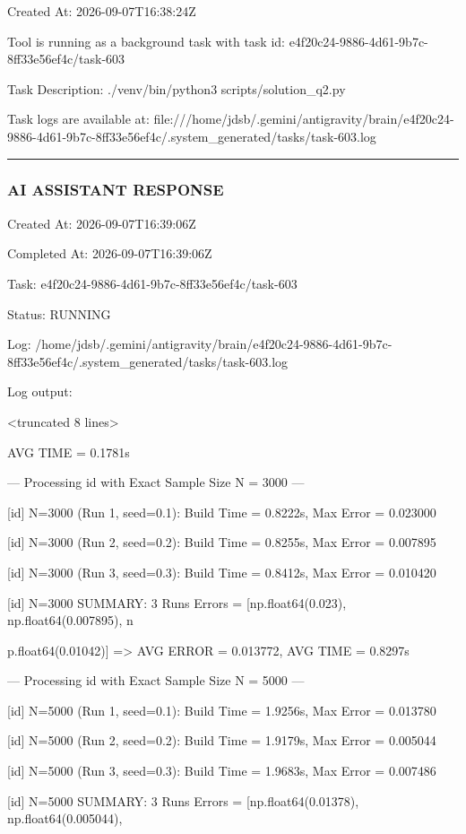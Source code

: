\documentclass[11pt,a4paper]{article}
\begin{document}
Created At: 2026-09-07T16:38:24Z

Tool is running as a background task with task id: e4f20c24-9886-4d61-9b7c-8ff33e56ef4c/task-603

Task Description: ./venv/bin/python3 scripts/solution\_q2.py

Task logs are available at: file:///home/jdsb/.gemini/antigravity/brain/e4f20c24-9886-4d61-9b7c-8ff33e56ef4c/.system\_generated/tasks/task-603.log


\hrule

\subsubsection{AI ASSISTANT RESPONSE}

Created At: 2026-09-07T16:39:06Z

Completed At: 2026-09-07T16:39:06Z

Task: e4f20c24-9886-4d61-9b7c-8ff33e56ef4c/task-603

Status: RUNNING

Log: /home/jdsb/.gemini/antigravity/brain/e4f20c24-9886-4d61-9b7c-8ff33e56ef4c/.system\_generated/tasks/task-603.log

Log output:

<truncated 8 lines>

AVG TIME = 0.1781s

--- Processing id with Exact Sample Size N = 3000 ---

[id] N=3000 (Run 1, seed=0.1): Build Time = 0.8222s, Max Error = 0.023000

[id] N=3000 (Run 2, seed=0.2): Build Time = 0.8255s, Max Error = 0.007895

[id] N=3000 (Run 3, seed=0.3): Build Time = 0.8412s, Max Error = 0.010420

[id] N=3000 SUMMARY: 3 Runs Errors = [np.float64(0.023), np.float64(0.007895), n

p.float64(0.01042)] => AVG ERROR = 0.013772, AVG TIME = 0.8297s

--- Processing id with Exact Sample Size N = 5000 ---

[id] N=5000 (Run 1, seed=0.1): Build Time = 1.9256s, Max Error = 0.013780

[id] N=5000 (Run 2, seed=0.2): Build Time = 1.9179s, Max Error = 0.005044

[id] N=5000 (Run 3, seed=0.3): Build Time = 1.9683s, Max Error = 0.007486

[id] N=5000 SUMMARY: 3 Runs Errors = [np.float64(0.01378), np.float64(0.005044),
\end{document}
